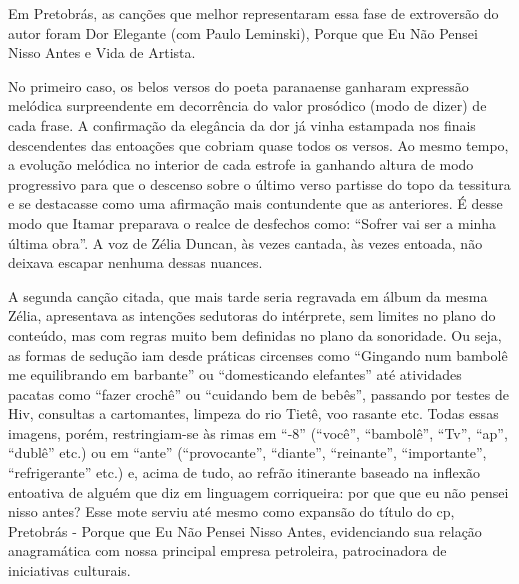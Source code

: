 Em Pretobrás, as canções que melhor representaram essa fase de
extroversão do autor foram Dor Elegante (com Paulo Leminski), Porque que
Eu Não Pensei Nisso Antes e Vida de Artista.

No primeiro caso, os belos versos do poeta paranaense ganharam expressão
melódica surpreendente em decorrência do valor prosódico (modo de dizer)
de cada frase. A confirmação da elegância da dor já vinha estampada nos
finais descendentes das entoações que cobriam quase todos os versos. Ao
mesmo tempo, a evolução melódica no interior de cada estrofe ia ganhando
altura de modo progressivo para que o descenso sobre o último verso
partisse do topo da tessitura e se destacasse como uma afirmação mais
contundente que as anteriores. É desse modo que Itamar preparava o
realce de desfechos como: ``Sofrer vai ser a minha última obra''. A voz
de Zélia Duncan, às vezes cantada, às vezes entoada, não deixava escapar
nenhuma dessas nuances.

A segunda canção citada, que mais tarde seria regravada em álbum da
mesma Zélia, apresentava as intenções sedutoras do intérprete, sem
limites no plano do conteúdo, mas com regras muito bem definidas no
plano da sonoridade. Ou seja, as formas de sedução iam desde práticas
circenses como ``Gingando num bambolê me equilibrando em barbante'' ou
``domesticando elefantes'' até atividades pacatas como ``fazer crochê''
ou ``cuidando bem de bebês'', passando por testes de Hiv, consultas a
cartomantes, limpeza do rio Tietê, voo rasante etc. Todas essas imagens,
porém, restringiam-se às rimas em ``-8'' (``você'', ``bambolê'', ``Tv'',
``ap'', ``dublê'' etc.) ou em ``ante'' (``provocante'', ``diante'',
``reinante'', ``importante'', ``refrigerante'' etc.) e, acima de tudo,
ao refrão itinerante baseado na inflexão entoativa de alguém que diz em
linguagem corriqueira: por que que eu não pensei nisso antes? Esse mote
serviu até mesmo como expansão do título do cp, Pretobrás - Porque que
Eu Não Pensei Nisso Antes, evidenciando sua relação anagramática com
nossa principal empresa petroleira, patrocinadora de iniciativas
culturais.

